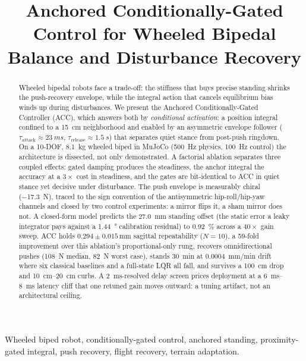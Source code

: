 \documentclass[conference]{IEEEtran}
\title{Anchored Conditionally-Gated Control for Wheeled Bipedal Balance and Disturbance Recovery}
\author{
\IEEEauthorblockN{Author's name}
\IEEEauthorblockA{
The University of Danang, Viet Nam\\
Email: Mailexample@gmail.com
}
}
\begin{document}
\maketitle

\begin{abstract}
Wheeled bipedal robots face a trade-off: the stiffness that buys precise standing shrinks the push-recovery envelope, while the integral action that cancels equilibrium bias winds up during disturbances. We present the Anchored Conditionally-Gated Controller (ACC), which answers both by \emph{conditional activation}: a position integral confined to a \SI{15}{cm} neighborhood and enabled by an asymmetric envelope follower ($\tau_{\text{attack}}{\approx}\SI{23}{ms}$, $\tau_{\text{release}}{\approx}\SI{1.5}{s}$) that separates quiet stance from post-push ringdown. On a \num{10}-DOF, \SI{8.1}{kg} wheeled biped in MuJoCo (\SI{500}{Hz} physics, \SI{100}{Hz} control) the architecture is dissected, not only demonstrated. A factorial ablation separates three coupled effects: gated damping produces the steadiness, the anchor integral the accuracy at a $3{\times}$ cost in steadiness, and the gates are bit-identical to ACC in quiet stance yet decisive under disturbance. The push envelope is measurably chiral (\SI{-17.3}{N}), traced to the sign convention of the antisymmetric hip-roll/hip-yaw channels and closed by two control experiments: a mirror flips it, a sham mirror does not. A closed-form model predicts the \SI{27.0}{mm} standing offset (the static error a leaky integrator pays against a \SI{1.44}{\degree} calibration residual) to \SI{0.92}{\percent} across a $40{\times}$ gain sweep. ACC holds $0.294{\pm}0.015$\,mm sagittal repeatability ($N{=}10$), a \num{59}-fold improvement over this ablation's proportional-only rung, recovers omnidirectional pushes (\SI{108}{N} median, \SI{82}{N} worst case), stands \SI{30}{min} at \SI{0.0004}{mm/min} drift where six classical baselines and a full-state LQR all fall, and survives a \SI{100}{cm} drop and \SIrange{10}{20}{cm} curbs. A \SI{2}{ms}-resolved delay screen prices deployment at a \SIrange{6}{8}{ms} latency cliff that one retuned gain moves outward: a tuning artifact, not an architectural ceiling.
\end{abstract}
\begin{IEEEkeywords}
Wheeled biped robot, conditionally-gated control, anchored standing, proximity-gated integral, push recovery, flight recovery, terrain adaptation.
\end{IEEEkeywords}
\end{document}
